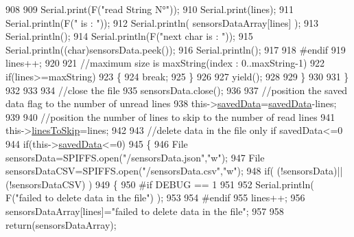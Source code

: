 \begin{DoxyCode}
908      
909                 Serial.print(F(\textcolor{stringliteral}{"read String N°"}));
910                 Serial.print(lines);
911                 Serial.println(F(\textcolor{stringliteral}{" is : "}));
912                 Serial.println( sensorsDataArray[lines] );
913                 Serial.println();
914                 Serial.println(F(\textcolor{stringliteral}{"next char is : "}));
915                 Serial.println((\textcolor{keywordtype}{char})sensorsData.peek());
916                 Serial.println();           
917             
918 \textcolor{preprocessor}{            #endif}
919                 lines++;
920             
921                 \textcolor{comment}{//maximum size is maxString(index : 0..maxString-1)}
922                 \textcolor{keywordflow}{if}(lines>=maxString)
923                 \{
924                     \textcolor{keywordflow}{break};
925                 \}
926             
927                 yield();
928             
929             \}
930 
931         \}
932         
933                     
934         \textcolor{comment}{//close the file}
935         sensorsData.close();
936 
937         \textcolor{comment}{//position the saved data flag to the number of unread lines}
938         this->\hyperlink{class_cool_file_system_ad9f5b739a32100f5f21270c3d9ee2b1d}{savedData}=\hyperlink{class_cool_file_system_ad9f5b739a32100f5f21270c3d9ee2b1d}{savedData}-lines;
939         
940         \textcolor{comment}{//position the number of lines to skip to the number of read lines  }
941         this->\hyperlink{class_cool_file_system_a84fdb6057e534b395512463daa28ea3c}{linesToSkip}=lines;
942 
943         \textcolor{comment}{//delete data in the file only if savedData<=0}
944         \textcolor{keywordflow}{if}(this->\hyperlink{class_cool_file_system_ad9f5b739a32100f5f21270c3d9ee2b1d}{savedData}<=0)
945         \{
946             File sensorsData=SPIFFS.open(\textcolor{stringliteral}{"/sensorsData.json"},\textcolor{stringliteral}{"w"});
947             File sensorsDataCSV=SPIFFS.open(\textcolor{stringliteral}{"/sensorsData.csv"},\textcolor{stringliteral}{"w"});
948             \textcolor{keywordflow}{if}( (!sensorsData)||(!sensorsDataCSV) ) 
949             \{
950 \textcolor{preprocessor}{            #if DEBUG == 1}
951     
952                 Serial.println( F(\textcolor{stringliteral}{"failed to delete data in the file"}) );
953     
954 \textcolor{preprocessor}{            #endif}
955                 lines++;
956                 sensorsDataArray[lines]=\textcolor{stringliteral}{"failed to delete data in the file"};
957 
958                 \textcolor{keywordflow}{return}(sensorsDataArray);

\end{DoxyCode}
